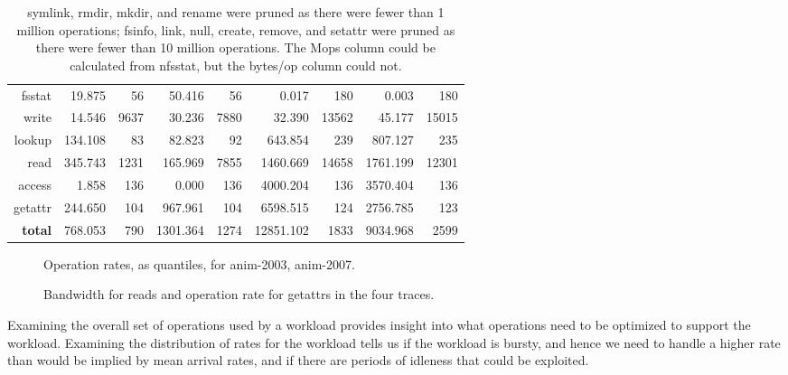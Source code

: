 \begin{table*}
\begin{tabular}{|r||r|r||r|r||r|r||r|r|}
      fsstat &    19.875 &    56 &    50.416 &    56 &     0.017 &   180 &     0.003 &   180 \\
       write &    14.546 &  9637 &    30.236 &  7880 &    32.390 & 13562 &    45.177 & 15015 \\
\hline
      lookup &   134.108 &    83 &    82.823 &    92 &   643.854 &   239 &   807.127 &   235 \\
        read &   345.743 &  1231 &   165.969 &  7855 &  1460.669 & 14658 &  1761.199 & 12301 \\
      access &     1.858 &   136 &     0.000 &   136 &  4000.204 &   136 &  3570.404 &   136 \\
     getattr &   244.650 &   104 &   967.961 &   104 &  6598.515 &   124 &  2756.785 &   123 \\
\hline
 {\bf total} &   768.053 &   790 &  1301.364 &  1274 & 12851.102 &  1833 &  9034.968 &  2599 \\
\hline
\end{tabular}

\caption{symlink, rmdir, mkdir, and rename were pruned as there were
fewer than 1 million operations; fsinfo, link, null, create, remove,
and setattr were pruned as there were fewer than 10 million
operations.  The Mops column could be calculated from nfsstat, but the
bytes/op column could not.}

\label{table:nfs-stats-overview}
\end{table*}

\begin{figure*}
\caption{Operation rates, as quantiles, for anim-2003, anim-2007.}
\label{fig:oprates}
\end{figure*}

\begin{figure*}
\caption{Bandwidth for reads and operation rate for getattrs in the four traces.}
\label{fig:bw-ops-quantiles}
\end{figure*}

Examining the overall set of operations used by a workload provides
insight into what operations need to be optimized to support the
workload.  Examining the distribution of rates for the workload tells
us if the workload is bursty, and hence we need to handle a higher
rate than would be implied by mean arrival rates, and if there are
periods of idleness that could be exploited.

